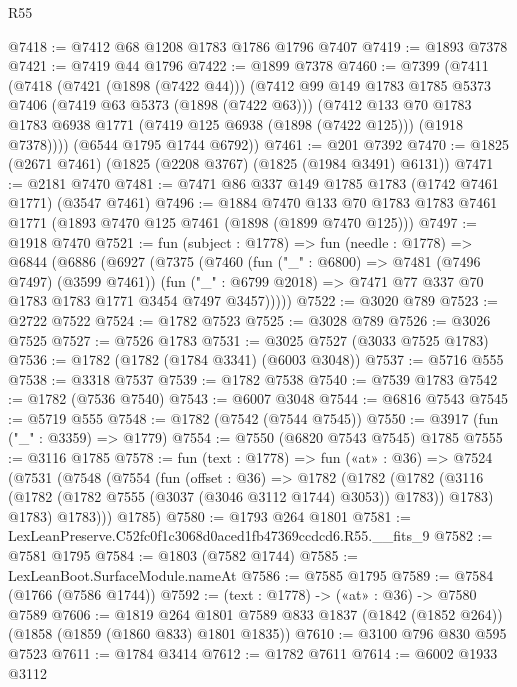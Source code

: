 \begin{lexlean}{R55}
\begin{coremodule}
@7418 := @7412 @68 @1208 @1783 @1786 @1796 @7407
@7419 := @1893 @7378
@7421 := @7419 @44 @1796
@7422 := @1899 @7378
@7460 := @7399
    (@7411
      (@7418
        (@7421 (@1898 (@7422 @44)))
        (@7412
          @99
          @149
          @1783
          @1785
          @5373
          @7406
          (@7419 @63 @5373 (@1898 (@7422 @63)))
          (@7412
            @133
            @70
            @1783
            @1783
            @6938
            @1771
            (@7419 @125 @6938 (@1898 (@7422 @125)))
            (@1918 @7378))))
      (@6544 @1795 @1744 @6792))
@7461 := @201 @7392
@7470 := @1825 (@2671 @7461) (@1825 (@2208 @3767) (@1825 (@1984 @3491) @6131))
@7471 := @2181 @7470
@7481 := @7471 @86 @337 @149 @1785 @1783 (@1742 @7461 @1771) (@3547 @7461)
@7496 := @1884
    @7470
    @133
    @70
    @1783
    @1783
    @7461
    @1771
    (@1893 @7470 @125 @7461 (@1898 (@1899 @7470 @125)))
@7497 := @1918 @7470
@7521 := fun (subject : @1778) =>
  fun (needle : @1778) =>
  @6844
    (@6886
      (@6927
        (@7375
          (@7460
            (fun ("_" : @6800) => @7481 (@7496 @7497) (@3599 @7461))
            (fun ("_" : @6799 @2018) => @7471 @77 @337 @70 @1783 @1783 @1771 @3454 @7497 @3457)))))
@7522 := @3020 @789
@7523 := @2722 @7522
@7524 := @1782 @7523
@7525 := @3028 @789
@7526 := @3026 @7525
@7527 := @7526 @1783
@7531 := @3025 @7527 (@3033 @7525 @1783)
@7536 := @1782 (@1782 (@1784 @3341) (@6003 @3048))
@7537 := @5716 @555
@7538 := @3318 @7537
@7539 := @1782 @7538
@7540 := @7539 @1783
@7542 := @1782 (@7536 @7540)
@7543 := @6007 @3048
@7544 := @6816 @7543
@7545 := @5719 @555
@7548 := @1782 (@7542 (@7544 @7545))
@7550 := @3917 (fun ("_" : @3359) => @1779)
@7554 := @7550 (@6820 @7543 @7545) @1785
@7555 := @3116 @1785
@7578 := fun (text : @1778) =>
  fun («at» : @36) =>
  @7524
    (@7531
      (@7548
        (@7554
          (fun (offset : @36) =>
          @1782
            (@1782
              (@1782 (@3116 (@1782 (@1782 @7555 (@3037 (@3046 @3112 @1744) @3053)) @1783)) @1783)
              @1783)
            @1783)))
      @1785)
@7580 := @1793 @264 @1801
@7581 := LexLeanPreserve.C52fc0f1c3068d0aced1fb47369ccdcd6.R55.__fits_9
@7582 := @7581 @1795
@7584 := @1803 (@7582 @1744)
@7585 := LexLeanBoot.SurfaceModule.nameAt
@7586 := @7585 @1795
@7589 := @7584 (@1766 (@7586 @1744))
@7592 := (text : @1778) -> («at» : @36) -> @7580 @7589
@7606 := @1819
    @264
    @1801
    @7589
    @833
    @1837
    (@1842 (@1852 @264))
    (@1858 (@1859 (@1860 @833) @1801 @1835))
@7610 := @3100 @796 @830 @595 @7523
@7611 := @1784 @3414
@7612 := @1782 @7611
@7614 := @6002 @1933 @3112

\end{coremodule}
\end{lexlean}
